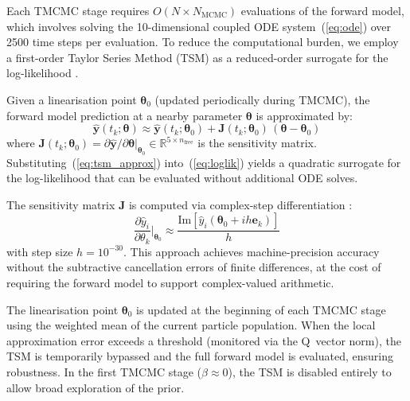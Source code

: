 \documentclass[11pt,a4paper]{article}
\begin{document}
Each TMCMC stage requires $O(N \times N_{\mathrm{MCMC}})$ evaluations of the forward model, which involves solving the 10-dimensional coupled ODE system~(\ref{eq:ode}) over 2500 time steps per evaluation. To reduce the computational burden, we employ a first-order Taylor Series Method (TSM) as a reduced-order surrogate for the log-likelihood \cite{GeislerJunker2025TSM, Fritsch2025BayesianMicrofilms}.

Given a linearisation point $\boldsymbol{\theta}_0$ (updated periodically during TMCMC), the forward model prediction at a nearby parameter $\boldsymbol{\theta}$ is approximated by:
\begin{equation}
  \hat{\mathbf{y}}(t_k; \boldsymbol{\theta}) \approx \hat{\mathbf{y}}(t_k; \boldsymbol{\theta}_0) + \mathbf{J}(t_k;\boldsymbol{\theta}_0)\,(\boldsymbol{\theta} - \boldsymbol{\theta}_0)
  \label{eq:tsm_approx}
\end{equation}
where $\mathbf{J}(t_k;\boldsymbol{\theta}_0) = \partial \hat{\mathbf{y}} / \partial \boldsymbol{\theta}\big|_{\boldsymbol{\theta}_0} \in \mathbb{R}^{5 \times n_{\mathrm{free}}}$ is the sensitivity matrix. Substituting~(\ref{eq:tsm_approx}) into~(\ref{eq:loglik}) yields a quadratic surrogate for the log-likelihood that can be evaluated without additional ODE solves.

The sensitivity matrix $\mathbf{J}$ is computed via complex-step differentiation \cite{Martins2003ComplexStep}:
\begin{equation}
  \frac{\partial \hat{y}_i}{\partial \theta_k}\bigg|_{\boldsymbol{\theta}_0}
  \approx \frac{\mathrm{Im}\!\left[\hat{y}_i(\boldsymbol{\theta}_0 + i h \mathbf{e}_k)\right]}{h}
  \label{eq:complex_step}
\end{equation}
with step size $h = 10^{-30}$. This approach achieves machine-precision accuracy without the subtractive cancellation errors of finite differences, at the cost of requiring the forward model to support complex-valued arithmetic.

The linearisation point $\boldsymbol{\theta}_0$ is updated at the beginning of each TMCMC stage using the weighted mean of the current particle population. When the local approximation error exceeds a threshold (monitored via the Q~vector norm), the TSM is temporarily bypassed and the full forward model is evaluated, ensuring robustness. In the first TMCMC stage ($\beta \approx 0$), the TSM is disabled entirely to allow broad exploration of the prior.
\end{document}
